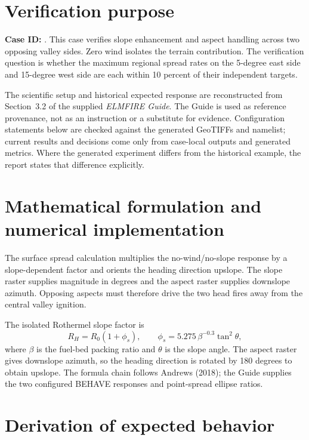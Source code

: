 \section{Verification purpose}

\textbf{Case ID:} \texttt{\CaseID}. This case verifies slope enhancement and aspect handling across two opposing valley sides.  Zero wind isolates the terrain contribution.  The verification question is whether the maximum regional spread rates on the 5-degree east side and 15-degree west side are each within 10 percent of their independent targets.

The scientific setup and historical expected response are reconstructed from Section~3.2 of the supplied \emph{ELMFIRE Guide}. The Guide is used as reference provenance, not as an instruction or a substitute for evidence. Configuration statements below are checked against the generated GeoTIFFs and namelist; current results and decisions come only from case-local outputs and generated metrics. Where the generated experiment differs from the historical example, the report states that difference explicitly.

\section{Mathematical formulation and numerical implementation}

The surface spread calculation multiplies the no-wind/no-slope response by a slope-dependent factor and orients the heading direction upslope.  The slope raster supplies magnitude in degrees and the aspect raster supplies downslope azimuth.  Opposing aspects must therefore drive the two head fires away from the central valley ignition.

The isolated Rothermel slope factor is
\begin{equation}
R_H=R_0(1+\phi_s), \qquad \phi_s=5.275\,\beta^{-0.3}\tan^2\theta,
\end{equation}
where \(\beta\) is the fuel-bed packing ratio and \(\theta\) is the slope angle. The aspect raster gives downslope azimuth, so the heading direction is rotated by 180 degrees to obtain upslope. The formula chain follows Andrews (2018); the Guide supplies the two configured BEHAVE responses and point-spread ellipse ratios.

\section{Derivation of expected behavior}

